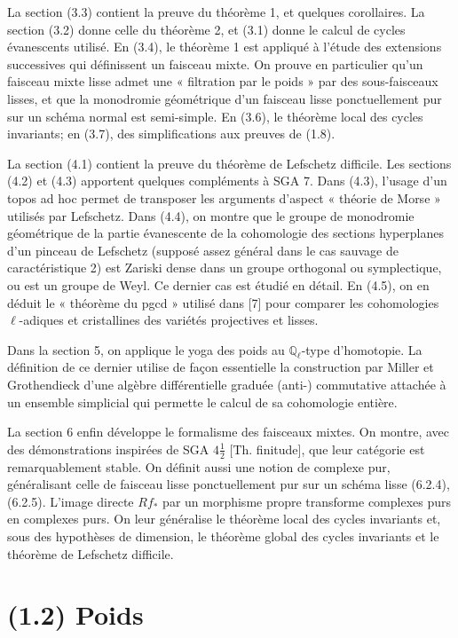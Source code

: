 \documentclass[11pt]{article}
\theoremstyle{remark}
\newcommand{\Ql}{\mathbb{Q}_\ell}
\begin{document}
La section (3.3) contient la preuve du théorème 1, et quelques corollaires. La section (3.2) donne celle du théorème 2, et (3.1) donne le calcul de cycles évanescents utilisé. En (3.4), le théorème 1 est appliqué à l'étude des extensions successives qui définissent un faisceau mixte. On prouve en particulier qu'un faisceau mixte lisse admet une « filtration par le poids » par des sous-faisceaux lisses, et que la monodromie géométrique d'un faisceau lisse ponctuellement pur sur un schéma normal est semi-simple. En (3.6), le théorème local des cycles invariants; en (3.7), des simplifications aux preuves de (1.8).

La section (4.1) contient la preuve du théorème de Lefschetz difficile. Les sections (4.2) et (4.3) apportent quelques compléments à SGA 7. Dans (4.3), l'usage d'un topos ad hoc permet de transposer les arguments d'aspect « théorie de Morse » utilisés par Lefschetz. Dans (4.4), on montre que le groupe de monodromie géométrique de la partie évanescente de la cohomologie des sections hyperplanes d'un pinceau de Lefschetz (supposé assez général dans le cas sauvage de caractéristique 2) est Zariski dense dans un groupe orthogonal ou symplectique, ou est un groupe de Weyl. Ce dernier cas est étudié en détail. En (4.5), on en déduit le « théorème du pgcd » utilisé dans [7] pour comparer les cohomologies $\ell$-adiques et cristallines des variétés projectives et lisses.

Dans la section 5, on applique le yoga des poids au $\Ql$-type d'homotopie. La définition de ce dernier utilise de façon essentielle la construction par Miller et Grothendieck d'une algèbre différentielle graduée (anti-) commutative attachée à un ensemble simplicial qui permette le calcul de sa cohomologie entière.

La section 6 enfin développe le formalisme des faisceaux mixtes. On montre, avec des démonstrations inspirées de SGA $4\frac12$ [Th. finitude], que leur catégorie est remarquablement stable. On définit aussi une notion de complexe pur, généralisant celle de faisceau lisse ponctuellement pur sur un schéma lisse (6.2.4), (6.2.5). L'image directe $Rf_*$ par un morphisme propre transforme complexes purs en complexes purs. On leur généralise le théorème local des cycles invariants et, sous des hypothèses de dimension, le théorème global des cycles invariants et le théorème de Lefschetz difficile.

\section*{(1.2) Poids}
\end{document}
